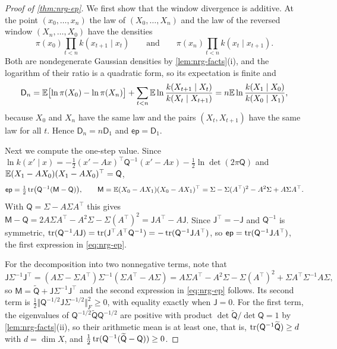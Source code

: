 \begin{proof}[Proof of \cref{thm:nrg-ep}]
We first show that the window divergence is additive. At the point $(x_0,\dots,x_n)$ the law of $(X_0,\dots,X_n)$ and the law of the reversed window $(X_n,\dots,X_0)$ have the densities
\[
\pi(x_0)\prod_{t<n}k(x_{t+1}\mid x_t)\qquad\text{and}\qquad\pi(x_n)\prod_{t<n}k(x_t\mid x_{t+1}).
\]
Both are nondegenerate Gaussian densities by \cref{lem:nrg-facts}(i), and the logarithm of their ratio is a quadratic form, so its expectation is finite and
\[
\mathsf D_n=\mathbb{E}\bigl[\ln\pi(X_0)-\ln\pi(X_n)\bigr]+\sum_{t<n}\mathbb{E}\ln\frac{k(X_{t+1}\mid X_t)}{k(X_t\mid X_{t+1})}=n\mathbb{E}\ln\frac{k(X_1\mid X_0)}{k(X_0\mid X_1)},
\]
because $X_0$ and $X_n$ have the same law and the pairs $(X_t,X_{t+1})$ have the same law for all $t$. Hence $\mathsf D_n=n\mathsf D_1$ and $\mathsf{ep}=\mathsf D_1$.

Next we compute the one-step value. Since $\ln k(x'\mid x)=-\tfrac12(x'-Ax)^\top\mathsf Q^{-1}(x'-Ax)-\tfrac12\ln\det(2\pi\mathsf Q)$ and $\mathbb{E}(X_1-AX_0)(X_1-AX_0)^\top=\mathsf Q$,
\[
\mathsf{ep}=\tfrac12\operatorname{tr}\bigl(\mathsf Q^{-1}(\mathsf M-\mathsf Q)\bigr),\qquad\mathsf M=\mathbb{E}(X_0-AX_1)(X_0-AX_1)^\top=\Sigma-\Sigma(A^\top)^2-A^2\Sigma+A\Sigma A^\top .
\]
With $\mathsf Q=\Sigma-A\Sigma A^\top$ this gives $\mathsf M-\mathsf Q=2A\Sigma A^\top-A^2\Sigma-\Sigma(A^\top)^2=\mathsf JA^\top-A\mathsf J$. Since $\mathsf J^\top=-\mathsf J$ and $\mathsf Q^{-1}$ is symmetric, $\operatorname{tr}(\mathsf Q^{-1}A\mathsf J)=\operatorname{tr}(\mathsf J^\top A^\top\mathsf Q^{-1})=-\operatorname{tr}(\mathsf Q^{-1}\mathsf JA^\top)$, so $\mathsf{ep}=\operatorname{tr}(\mathsf Q^{-1}\mathsf JA^\top)$, the first expression in \cref{eq:nrg-ep}.

For the decomposition into two nonnegative terms, note that
\[
\mathsf J\Sigma^{-1}\mathsf J^\top=(A\Sigma-\Sigma A^\top)\Sigma^{-1}(\Sigma A^\top-A\Sigma)=A\Sigma A^\top-A^2\Sigma-\Sigma(A^\top)^2+\Sigma A^\top\Sigma^{-1}A\Sigma,
\]
so $\mathsf M=\widetilde{\mathsf Q}+\mathsf J\Sigma^{-1}\mathsf J^\top$ and the second expression in \cref{eq:nrg-ep} follows. Its second term is $\tfrac12\Vert\mathsf Q^{-1/2}\mathsf J\Sigma^{-1/2}\Vert_F^2\ge0$, with equality exactly when $\mathsf J=0$. For the first term, the eigenvalues of $\mathsf Q^{-1/2}\widetilde{\mathsf Q}\mathsf Q^{-1/2}$ are positive with product $\det\widetilde{\mathsf Q}/\det\mathsf Q=1$ by \cref{lem:nrg-facts}(ii), so their arithmetic mean is at least one, that is, $\operatorname{tr}(\mathsf Q^{-1}\widetilde{\mathsf Q})\ge d$ with $d=\dim X$, and $\tfrac12\operatorname{tr}(\mathsf Q^{-1}(\widetilde{\mathsf Q}-\mathsf Q))\ge0$.


\end{proof}
